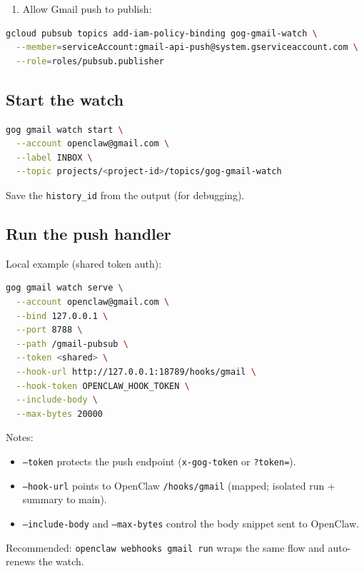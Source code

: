 \begin{enumerate}
  \item Allow Gmail push to publish:
\end{enumerate}


\begin{lstlisting}[language=bash]
gcloud pubsub topics add-iam-policy-binding gog-gmail-watch \
  --member=serviceAccount:gmail-api-push@system.gserviceaccount.com \
  --role=roles/pubsub.publisher
\end{lstlisting}


\subsection{Start the watch}


\begin{lstlisting}[language=bash]
gog gmail watch start \
  --account openclaw@gmail.com \
  --label INBOX \
  --topic projects/<project-id>/topics/gog-gmail-watch
\end{lstlisting}


Save the \texttt{history\_id} from the output (for debugging).

\subsection{Run the push handler}


Local example (shared token auth):

\begin{lstlisting}[language=bash]
gog gmail watch serve \
  --account openclaw@gmail.com \
  --bind 127.0.0.1 \
  --port 8788 \
  --path /gmail-pubsub \
  --token <shared> \
  --hook-url http://127.0.0.1:18789/hooks/gmail \
  --hook-token OPENCLAW_HOOK_TOKEN \
  --include-body \
  --max-bytes 20000
\end{lstlisting}


Notes:

\begin{itemize}
  \item \texttt{--token} protects the push endpoint (\texttt{x-gog-token} or \texttt{?token=}).
  \item \texttt{--hook-url} points to OpenClaw \texttt{/hooks/gmail} (mapped; isolated run + summary to main).
  \item \texttt{--include-body} and \texttt{--max-bytes} control the body snippet sent to OpenClaw.
\end{itemize}


Recommended: \texttt{openclaw webhooks gmail run} wraps the same flow and auto-renews the watch.

